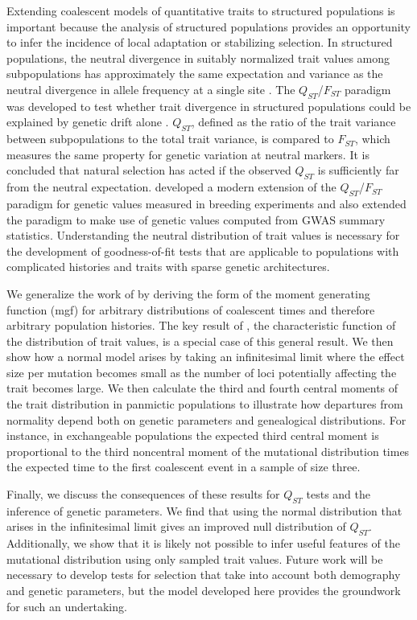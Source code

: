 Extending coalescent models of quantitative traits to structured populations is
important because the analysis of structured populations provides an opportunity
to infer the incidence of local adaptation or stabilizing selection. In
structured populations, the neutral divergence in suitably normalized trait
values among subpopulations has approximately the same expectation and variance
as the neutral divergence in allele frequency at a single
site \citep{Rogers1983,Whitlock2008}. The $Q_{ST}$/$F_{ST}$ paradigm was
developed to test whether trait divergence in structured populations could be
explained by genetic drift alone \citep{Spitze1993,Whitlock2008,Leinonen2013}.
$Q_{ST}$, defined as the ratio of the trait variance between subpopulations to
the total trait variance, is compared to $F_{ST}$, which measures the same
property for genetic variation at neutral markers. It is concluded that natural
selection has acted if the observed $Q_{ST}$ is sufficiently far from the
neutral expectation. \citet{Ovaskainen2011} developed a modern extension of the
$Q_{ST}$/$F_{ST}$ paradigm for genetic values measured in breeding experiments
and \citet{Berg2014} also extended the paradigm to make use of genetic values
computed from GWAS summary statistics. Understanding the neutral distribution of
trait values is necessary for the development of goodness-of-fit tests that are
applicable to populations with complicated histories and traits with sparse
genetic architectures.

We generalize the work of \citet{Schraiber2015} by deriving the form of the
moment generating function (mgf) for arbitrary distributions of coalescent times
and therefore arbitrary population histories. The key result
of \citet{Schraiber2015}, the characteristic function of the distribution of
trait values, is a special case of this general result. We then show how a
normal model arises by taking an infinitesimal limit where the effect size per
mutation becomes small as the number of loci potentially affecting the trait
becomes large. We then calculate the third and fourth central moments of the
trait distribution in panmictic populations to illustrate how departures from
normality depend both on genetic parameters and genealogical distributions. For
instance, in exchangeable populations the expected third central moment is
proportional to the third noncentral moment of the mutational distribution times
the expected time to the first coalescent event in a sample of size three.

Finally, we discuss the consequences of these results for $Q_{ST}$ tests and the
inference of genetic parameters. We find that using the normal distribution that
arises in the infinitesimal limit gives an improved null distribution of
$Q_{ST}$. Additionally, we show that it is likely not possible to infer useful
features of the mutational distribution using only sampled trait values. Future
work will be necessary to develop tests for selection that take into account
both demography and genetic parameters, but the model developed here provides
the groundwork for such an undertaking.

